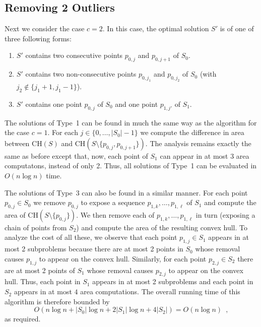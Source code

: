 \documentclass[lotsofwhite]{patmorin}
\newcommand{\ch}{\mathrm{CH}}
\begin{document}
\subsection{Removing 2 Outliers}

Next we consider the case $c=2$.  In this case, the optimal solution
$S'$ is of one of three following forms:

\begin{enumerate}

\item $S'$ contains two consecutive points $p_{0,j}$ and $p_{0,j+1}$
of $S_0$.

\item $S'$ contains two non-consecutive points $p_{0,j_1}$ and
$p_{0,j_2}$ of $S_0$ (with $j_2\not\in\{j_1+1,j_1-1\}$).

\item $S'$ contains one point $p_{0,j}$ of $S_0$ and one point
$p_{1,j'}$ of $S_1$.

\end{enumerate}

The solutions of Type~1 can be found in much the same way as the
algorithm for the case $c=1$.  For each $j\in\{0,\ldots,|S_0|-1\}$ we
compute the difference in area between $\ch(S)$ and
$\ch(S\setminus\{p_{0,j},p_{0,j+1}\})$.  The analysis remains exactly
the same as before except that, now, each point of $S_1$ can appear in
at most $3$ area computatons, instead of only 2.  Thus, all solutions
of Type~1 can be evaluated in $O(n\log n)$ time.

The solutions of Type~3 can also be found in a similar manner.  For
each point $p_{0,j}\in S_0$ we remove $p_{0,j}$ to expose a sequence
$p_{1,k},\ldots,p_{1,\ell}$ of $S_1$ and compute the area of
$\ch(S\setminus\{p_{0,j}\})$.  We then remove each of
$p_{1,k},\ldots,p_{1,\ell}$ in turn (exposing a chain of points from
$S_2$) and compute the area of the resulting convex hull.  To analyze
the cost of all these, we observe that each point $p_{1,j}\in S_1$
appears in at most 2 subproblems because there are at most 2 points in
$S_0$ whose removal causes $p_{1,j}$ to appear on the convex hull.
Similarly, for each point $p_{2,j}\in S_2$ there are at most 2 points
of $S_1$ whose removal causes $p_{2,j}$ to appear on the convex hull.
Thus, each point in $S_1$ appears in at most 2 subproblems and each
point in $S_2$ appears in at most $4$ area computations.  The overall
running time of this algorithm is therefore bounded by
\[
    O\left(n\log n + |S_0|\log n + 2|S_1|\log n + 4|S_2|\right) = O(n\log n) \enspace ,
\]
as required.
\end{document}
